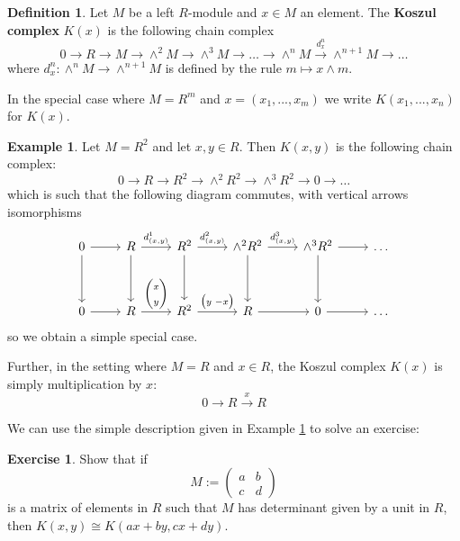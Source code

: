\documentclass[12pt]{article}
\theoremstyle{plain}
\theoremstyle{definition}
\newtheorem{defn}[thm]{Definition} %
\newtheorem{exercise}[thm]{Exercise}
\newtheorem{example}[thm]{Example}
\newcommand{\lto}{\longrightarrow}
\begin{document}
%
\begin{defn}\label{def:koszul_complex}
Let $M$ be a left $R$-module and $x \in M$ an element. The \textbf{Koszul complex} $K(x)$ is the following chain complex
\begin{equation}
0 \lto R \lto M \lto \wedge^2 M \lto \wedge^3 M \lto \hdots \lto \wedge^n M \stackrel{d_x^n}{\lto} \wedge^{n+1}M \lto \hdots
\end{equation}
where $d_x^n: \wedge^n M \lto \wedge^{n+1}M$ is defined by the rule $m \longmapsto x \wedge m$.

In the special case where $M = R^m$ and $x = (x_1,...,x_m)$ we write $K(x_1,...,x_n)$ for $K(x)$.
\end{defn}
\begin{example}\label{ex:K(x,y)}
Let $M = R^2$ and let $x,y \in R$. Then $K(x,y)$ is the following chain complex:
\begin{equation}
0 \lto R \lto R^2 \lto \wedge^2 R^2 \lto \wedge^3 R^2 \lto 0 \lto \hdots
\end{equation}
which is such that the following diagram commutes, with vertical arrows isomorphisms
\begin{equation}
\begin{tikzcd}[row sep = huge]
0\arrow[r]\arrow[d] & R\arrow[r,"{d_{(x,y)}^1}"]\arrow[d] & R^2\arrow[r,"{d_{(x,y)}^2}"]\arrow[d] &\wedge^2 R^2\arrow[r,"{d_{(x,y)}^3}"]\arrow[d] & \wedge^3 R^2\arrow[d]\arrow[r] &  \hdots\\
0\arrow[r] & R\arrow[r,"{\begin{pmatrix}
x\\
y
\end{pmatrix}
}"] & R^2\arrow[r,"{\begin{pmatrix}
y \text{  } -x
\end{pmatrix}
}"]  & R\arrow[r] & 0\arrow[r] & \hdots
\end{tikzcd}
\end{equation}
so we obtain a simple special case.

Further, in the setting where $M = R$ and $x \in R$, the Koszul complex $K(x)$ is simply multiplication by $x$:
\begin{equation}
0 \lto R \stackrel{x}{\lto} R
\end{equation}
\end{example}
We can use the simple description given in Example \ref{ex:K(x,y)} to solve an exercise:
\begin{exercise}
Show that if
\begin{equation}
M := \begin{pmatrix}
a & b\\
c & d
\end{pmatrix}
\end{equation}
is a matrix of elements in $R$ such that $M$ has determinant given by a unit in $R$, then $K(x,y) \cong K(ax + by, cx + dy)$.
\end{exercise}
\end{document}
